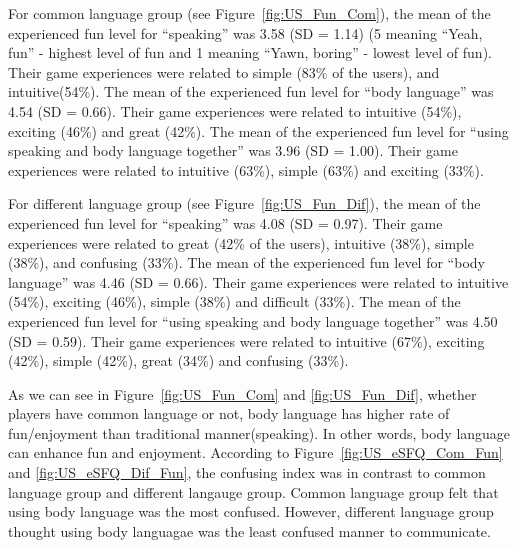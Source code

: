 For common language group (see Figure~\ref{fig:US_Fun_Com}), the mean of the experienced fun level for ``speaking'' was 3.58 (SD = 1.14) (5 meaning ``Yeah, fun'' - highest level of fun and 1 meaning ``Yawn, boring'' - lowest level of fun). Their game experiences were related to simple (83\% of the users), and intuitive(54\%). The mean of the experienced fun level for ``body language'' was 4.54 (SD = 0.66). Their game experiences were related to intuitive (54\%), exciting (46\%) and great (42\%). The mean of the experienced fun level for ``using speaking and body language together'' was 3.96 (SD = 1.00). Their game experiences were related to intuitive (63\%), simple (63\%) and exciting (33\%). 

For different language group (see Figure~\ref{fig:US_Fun_Dif}), the mean of the experienced fun level for ``speaking'' was 4.08 (SD = 0.97). Their game experiences were related to great (42\% of the users), intuitive (38\%), simple (38\%), and confusing (33\%). The mean of the experienced fun level for ``body language'' was 4.46 (SD = 0.66). Their game experiences were related to intuitive (54\%), exciting (46\%), simple (38\%) and difficult (33\%). The mean of the experienced fun level for ``using speaking and body language together'' was 4.50 (SD = 0.59). Their game experiences were related to intuitive (67\%), exciting (42\%), simple (42\%), great (34\%) and confusing (33\%).


As we can see in Figure~\ref{fig:US_Fun_Com} and \ref{fig:US_Fun_Dif}, whether players have common language or not, body language has higher rate of fun/enjoyment than traditional manner(speaking). In other words, body language can enhance fun and enjoyment. According to Figure~\ref{fig:US_eSFQ_Com_Fun} and \ref{fig:US_eSFQ_Dif_Fun}, the confusing index was in contrast to common language group and different langauge group. Common language group felt that using body language was the most confused. However, different language group thought using body languagae was the least confused manner to communicate.

